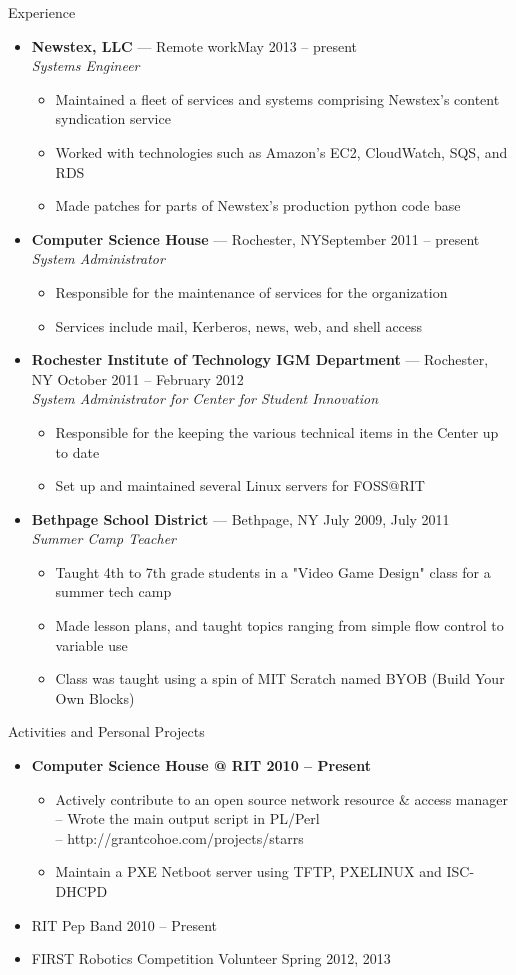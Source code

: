 \documentclass[10pt,oneside]{article}
\newenvironment{ressection}[1]{
	\vspace{3pt}
	{\fontfamily{ppl}\selectfont\Large#1}
	\begin{itemize}
	\vspace{2pt}
}{
	\end{itemize}
}
\newcommand{\resitem}[1]{
	\vspace{-2pt}
	\item \begin{flushleft} #1 \end{flushleft}
}
\newcommand{\ressubitem}[1]{
	\vspace{-1pt}
	\item \begin{flushleft} #1 \end{flushleft}
}
\newcommand{\resbigitem}[3]{
	\vspace{-3pt}
	\item
	\textbf{#1} --- #2 \\
	\textit{#3}
}
\newenvironment{ressubsec}[3]{
	\resbigitem{#1}{#2}{#3}
	\vspace{-1pt}
	\begin{itemize}
}{
	\end{itemize}
}
\newenvironment{reslist}[1]{
	\resitem{\textbf{#1}}
	\vspace{-3pt}
	\begin{itemize}
}{
	\end{itemize}
}
\begin{document}
\begin{ressection}{Experience}

	\begin{ressubsec}{Newstex, LLC}{Remote work\hfill May 2013 -- present}{Systems Engineer}
		\ressubitem{Maintained a fleet of services and systems comprising Newstex's content syndication service}
		\ressubitem{Worked with technologies such as Amazon's EC2, CloudWatch, SQS, and RDS}
		\ressubitem{Made patches for parts of Newstex's production python code base}
	\end{ressubsec}
	\begin{ressubsec}{Computer Science House}{Rochester, NY\hfill September 2011 -- present}{System Administrator}
		\ressubitem{Responsible for the maintenance of services for the organization}
		\ressubitem{Services include mail, Kerberos, news, web, and shell access}
	\end{ressubsec}
	\begin{ressubsec}{Rochester Institute of Technology IGM Department}{Rochester, NY \hfill October 2011 -- February 2012}{System Administrator for Center for Student Innovation}
		\ressubitem{Responsible for the keeping the various technical items in the Center up to date}
		\ressubitem{Set up and maintained several Linux servers for FOSS@RIT}
	\end{ressubsec}
	\begin{ressubsec}{Bethpage School District}{Bethpage, NY \hfill July 2009,  July 2011}{Summer Camp Teacher}
		\ressubitem{Taught 4th to 7th grade students in a "Video Game Design" class for a summer tech camp}
		\ressubitem{Made lesson plans, and taught topics ranging from simple flow control to variable use}
		\ressubitem{Class was taught using a spin of MIT Scratch named BYOB (Build Your Own Blocks)}
	\end{ressubsec}

\end{ressection}


\begin{ressection}{Activities and Personal Projects}
	\begin{reslist}{Computer Science House @ RIT \hfill 2010 -- Present}
		\ressubitem{Actively contribute to an open source network resource \& access manager \\
			\hspace{8pt} -- Wrote the main output script in PL/Perl \\ 
			\hspace{8pt} -- http://grantcohoe.com/projects/starrs}
		\ressubitem{Maintain a PXE Netboot server using TFTP, PXELINUX and ISC-DHCPD}
	\end{reslist}
	\resitem{RIT Pep Band \hfill 2010 -- Present}
	\resitem{FIRST Robotics Competition Volunteer \hfill Spring 2012, 2013}
\end{ressection}
\end{document}
